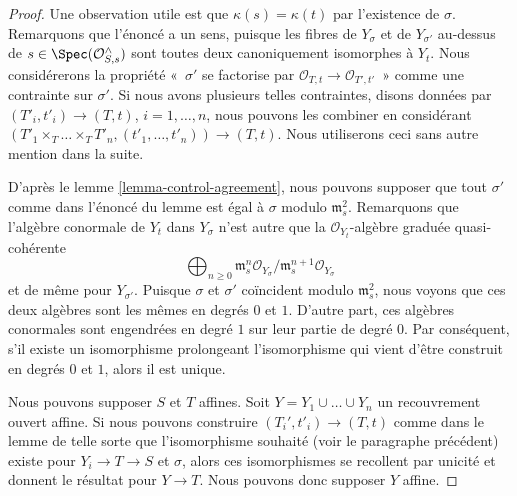 \begin{proof}
Une observation utile est que $\kappa(s) = \kappa(t)$ par l'existence de
$\sigma$. Remarquons que l'énoncé a un sens, puisque les fibres de $Y_\sigma$
et de $Y_{\sigma'}$ au-dessus de $s \in \Spec(\mathcal{O}_{S, s}^\wedge)$
sont toutes deux canoniquement isomorphes à $Y_t$. Nous considérerons la propriété
«~$\sigma'$ se factorise par $\mathcal{O}_{T, t} \to \mathcal{O}_{T', t'}$~»
comme une contrainte sur $\sigma'$. Si nous avons plusieurs telles contraintes,
disons données par $(T'_i, t'_i) \to (T, t)$, $i = 1, \ldots, n$,
nous pouvons les combiner en considérant
$(T'_1 \times_T \ldots \times_T T'_n, (t'_1, \ldots, t'_n)) \to
(T, t)$. Nous utiliserons ceci sans autre mention dans la suite.

\medskip\noindent
D'après le lemme \ref{lemma-control-agreement}, nous pouvons supposer que tout $\sigma'$
comme dans l'énoncé du lemme est égal à $\sigma$ modulo
$\mathfrak m_s^2$. Remarquons que l'algèbre conormale de $Y_t$ dans
$Y_\sigma$ n'est autre que la $\mathcal{O}_{Y_t}$-algèbre graduée quasi-cohérente
$$
\bigoplus\nolimits_{n \geq 0}
\mathfrak m_s^n\mathcal{O}_{Y_\sigma}/
\mathfrak m_s^{n + 1}\mathcal{O}_{Y_\sigma}
$$
et de même pour $Y_{\sigma'}$. Puisque $\sigma$ et $\sigma'$
coïncident modulo $\mathfrak m_s^2$, nous voyons que ces deux algèbres
sont les mêmes en degrés $0$ et $1$. D'autre part, ces
algèbres conormales sont engendrées en degré $1$ sur leur partie de degré $0$.
Par conséquent, s'il existe un isomorphisme prolongeant l'isomorphisme
qui vient d'être construit en degrés $0$ et $1$, alors il est unique.

\medskip\noindent
Nous pouvons supposer $S$ et $T$ affines. Soit $Y = Y_1 \cup \ldots \cup Y_n$
un recouvrement ouvert affine. Si nous pouvons construire $(T_i', t'_i) \to (T, t)$
comme dans le lemme de telle sorte que l'isomorphisme souhaité (voir le paragraphe précédent)
existe pour $Y_i \to T \to S$ et $\sigma$, alors ces isomorphismes se recollent par
unicité et donnent le résultat pour $Y \to T$. Nous pouvons donc supposer $Y$ affine.


\end{proof}
